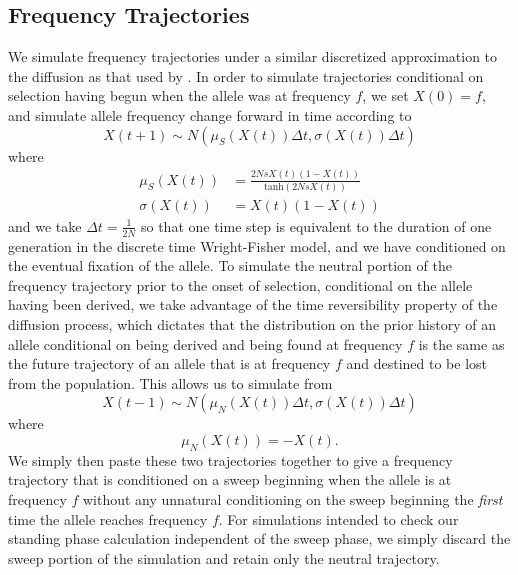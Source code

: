 \documentclass[a4paper,10pt]{article}
\begin{document}
\subsection*{Frequency Trajectories}
We simulate frequency trajectories under a similar discretized approximation to the diffusion as that used by \cite{Przeworski2005}. In order to simulate trajectories conditional on selection having begun when the allele was at frequency $f$, we set $X\left(0\right) = f$, and simulate allele frequency change forward in time according to
\begin{equation}
	X\left({t+1}\right) \sim N \left( \mu_S\left(X\left(t\right)\right)\Delta t , \sigma\left(X\left(t\right)\right)\Delta t \right)
\end{equation}
where
\begin{align}
	\mu_S\left(X\left(t\right)\right) &= \frac{2NsX\left(t\right)\left(1-X\left(t\right)\right)}{\textrm{tanh}\left(2NsX\left(t\right)\right)} \\
	\sigma\left(X\left(t\right)\right) &= X\left(t\right)\left(1-X\left(t\right)\right)
\end{align}
and we take $\Delta t = \frac{1}{2N}$ so that one time step is equivalent to the duration of one generation in the discrete time Wright-Fisher model, and we have conditioned on the eventual fixation of the allele. To simulate the neutral portion of the frequency trajectory prior to the onset of selection, conditional on the allele having been derived, we take advantage of the time reversibility property of the diffusion process, which dictates that the distribution on the prior history of an allele conditional on being derived and being found at frequency $f$ is the same as the future trajectory of an allele that is at frequency $f$ and destined to be lost from the population. This allows us to simulate from
\begin{equation}
	X\left(t-1\right) \sim N\left(\mu_N\left(X\left(t\right)\right) \Delta t, \sigma \left( X\left(t\right) \right)\Delta t\right)
\end{equation}
where
\begin{equation}
	\mu_N\left(X\left(t\right)\right) = - X\left(t\right).
\end{equation}
We simply then paste these two trajectories together to give a frequency trajectory that is conditioned on a sweep beginning when the allele is at frequency $f$ without any unnatural conditioning on the sweep beginning the \textit{first} time the allele reaches frequency $f$. For simulations intended to check our standing phase calculation independent of the sweep phase, we simply discard the sweep portion of the simulation and retain only the neutral trajectory.
\end{document}

